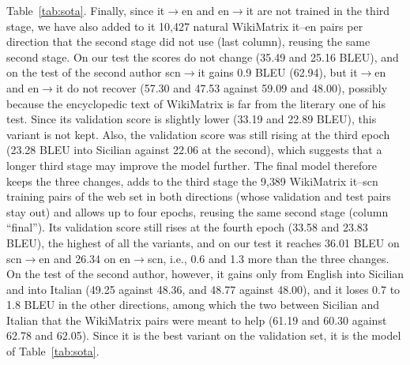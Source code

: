 \documentclass[11pt,a4paper]{article}
\begin{document}
Table~\ref{tab:sota}. Finally, since it$\to$en and en$\to$it are not trained in the third stage,
we have also added to it 10{,}427 natural WikiMatrix it--en pairs per direction that the second
stage did not use (last column), reusing the same second stage. On our test the scores do not
change (35.49 and 25.16 BLEU), and on the test of the second author scn$\to$it gains 0.9 BLEU
(62.94), but it$\to$en and en$\to$it do not recover (57.30 and 47.53 against 59.09 and 48.00),
possibly because the encyclopedic text of WikiMatrix is far from the literary one of his test.
Since its validation score is slightly lower (33.19 and 22.89 BLEU), this variant is not kept. Also, the validation score was still rising at the third epoch
(23.28 BLEU into Sicilian against 22.06 at the second), which suggests that a longer third stage
may improve the model further. The final model therefore keeps the three changes, adds to the third
stage the 9{,}389 WikiMatrix it--scn training pairs of the web set in both directions (whose
validation and test pairs stay out) and allows up to four epochs, reusing the same second stage
(column ``final''). Its validation score still rises at the fourth epoch (33.58 and 23.83 BLEU),
the highest of all the variants, and on our test it reaches 36.01 BLEU on scn$\to$en and 26.34
on en$\to$scn, i.e., 0.6 and 1.3 more than the three changes. On the test of the second author,
however, it gains only from English into Sicilian and into Italian (49.25 against 48.36, and 48.77
against 48.00), and it loses 0.7 to 1.8 BLEU in the other directions, among which the two between
Sicilian and Italian that the WikiMatrix pairs were meant to help (61.19 and 60.30 against 62.78
and 62.05). Since it is the best variant on the validation set, it is the model of
Table~\ref{tab:sota}.





\end{document}
